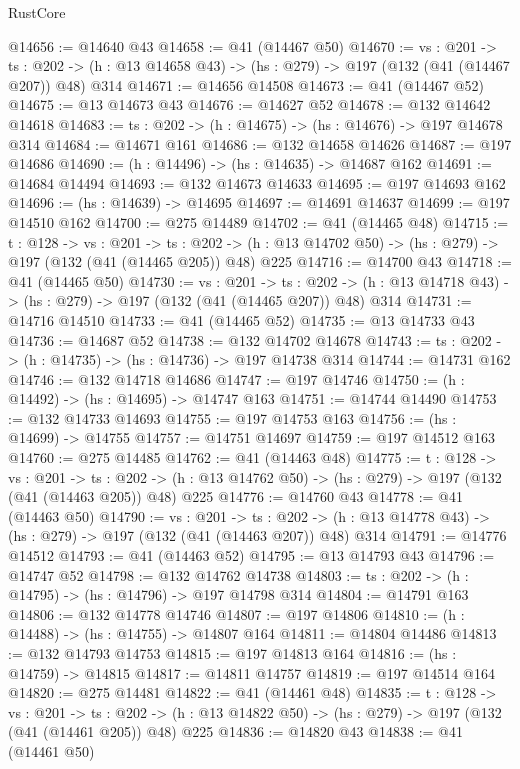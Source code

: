 \begin{lexlean}{RustCore}
\begin{coremodule}
@14656 := @14640 @43
@14658 := @41 (@14467 @50)
@14670 := {vs : @201} ->
  {ts : @202} -> (h : @13 @14658 @43) -> (hs : @279) -> @197 (@132 (@41 (@14467 @207)) @48) @314
@14671 := @14656 @14508
@14673 := @41 (@14467 @52)
@14675 := @13 @14673 @43
@14676 := @14627 @52
@14678 := @132 @14642 @14618
@14683 := {ts : @202} -> (h : @14675) -> (hs : @14676) -> @197 @14678 @314
@14684 := @14671 @161
@14686 := @132 @14658 @14626
@14687 := @197 @14686
@14690 := (h : @14496) -> (hs : @14635) -> @14687 @162
@14691 := @14684 @14494
@14693 := @132 @14673 @14633
@14695 := @197 @14693 @162
@14696 := (hs : @14639) -> @14695
@14697 := @14691 @14637
@14699 := @197 @14510 @162
@14700 := @275 @14489
@14702 := @41 (@14465 @48)
@14715 := {t : @128} ->
  {vs : @201} ->
  {ts : @202} -> (h : @13 @14702 @50) -> (hs : @279) -> @197 (@132 (@41 (@14465 @205)) @48) @225
@14716 := @14700 @43
@14718 := @41 (@14465 @50)
@14730 := {vs : @201} ->
  {ts : @202} -> (h : @13 @14718 @43) -> (hs : @279) -> @197 (@132 (@41 (@14465 @207)) @48) @314
@14731 := @14716 @14510
@14733 := @41 (@14465 @52)
@14735 := @13 @14733 @43
@14736 := @14687 @52
@14738 := @132 @14702 @14678
@14743 := {ts : @202} -> (h : @14735) -> (hs : @14736) -> @197 @14738 @314
@14744 := @14731 @162
@14746 := @132 @14718 @14686
@14747 := @197 @14746
@14750 := (h : @14492) -> (hs : @14695) -> @14747 @163
@14751 := @14744 @14490
@14753 := @132 @14733 @14693
@14755 := @197 @14753 @163
@14756 := (hs : @14699) -> @14755
@14757 := @14751 @14697
@14759 := @197 @14512 @163
@14760 := @275 @14485
@14762 := @41 (@14463 @48)
@14775 := {t : @128} ->
  {vs : @201} ->
  {ts : @202} -> (h : @13 @14762 @50) -> (hs : @279) -> @197 (@132 (@41 (@14463 @205)) @48) @225
@14776 := @14760 @43
@14778 := @41 (@14463 @50)
@14790 := {vs : @201} ->
  {ts : @202} -> (h : @13 @14778 @43) -> (hs : @279) -> @197 (@132 (@41 (@14463 @207)) @48) @314
@14791 := @14776 @14512
@14793 := @41 (@14463 @52)
@14795 := @13 @14793 @43
@14796 := @14747 @52
@14798 := @132 @14762 @14738
@14803 := {ts : @202} -> (h : @14795) -> (hs : @14796) -> @197 @14798 @314
@14804 := @14791 @163
@14806 := @132 @14778 @14746
@14807 := @197 @14806
@14810 := (h : @14488) -> (hs : @14755) -> @14807 @164
@14811 := @14804 @14486
@14813 := @132 @14793 @14753
@14815 := @197 @14813 @164
@14816 := (hs : @14759) -> @14815
@14817 := @14811 @14757
@14819 := @197 @14514 @164
@14820 := @275 @14481
@14822 := @41 (@14461 @48)
@14835 := {t : @128} ->
  {vs : @201} ->
  {ts : @202} -> (h : @13 @14822 @50) -> (hs : @279) -> @197 (@132 (@41 (@14461 @205)) @48) @225
@14836 := @14820 @43
@14838 := @41 (@14461 @50)

\end{coremodule}
\end{lexlean}
